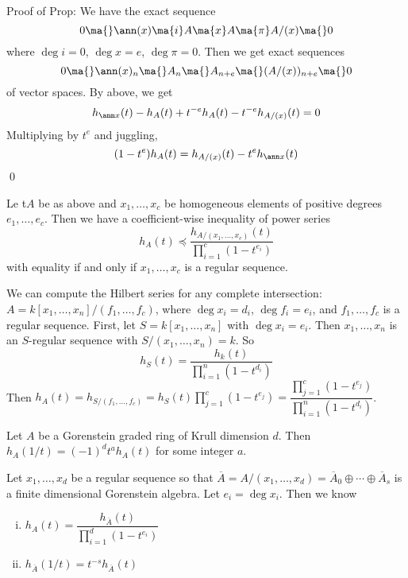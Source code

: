 Proof of Prop: We have the exact sequence
	\[
	0 \ma{} \ann(x) \ma{i} A \ma{x} A \ma{\pi} A/(x) \ma{} 0
	\]
where $\deg i=0$, $\deg x= e$, $\deg \pi = 0$. Then we get exact sequences
	\[
	0 \ma{} \ann(x)_n \ma{} A_n \ma{} A_{n+e} \ma{} (A/(x))_{n+e} \ma{} 0
	\]
of vector spaces. By above, we get
	\[
	h_{\ann x}(t) - h_A(t) + t^{-e} h_A(t) - t^{-e} h_{A/(x)}(t) = 0
	\]
Multiplying by $t^e$ and juggling, 
	\[
	(1-t^e) h_A(t) = h_{A/(x)}(t) - t^e h_{\ann x}(t)
	\]
\qed \\




\begin{cor}
Le t$A$ be as above and $x_1,\ldots,x_c$ be homogeneous elements of positive degrees $e_1,\ldots,e_c$. Then we have a coefficient-wise inequality of power series 
	\[
	h_A(t) \preccurlyeq \dfrac{h_{A/(x_1,\ldots,x_e)}(t)}{\prod_{i=1}^c (1-t^{e_i})}
	\]
with equality if and only if $x_1,\ldots,x_c$ is a regular sequence. 
\end{cor}


\begin{ex}
We can compute the Hilbert series for any complete intersection: $A= k[x_1,\ldots,x_n]/(f_1,\ldots,f_c)$, where $\deg x_i = d_i$, $\deg f_i= e_i$, and $f_1,\ldots,f_c$ is a regular sequence. First, let $S= k[x_1,\ldots,x_n]$ with $\deg x_i= e_i$. Then $x_1,\ldots,x_n$ is an $S$-regular sequence with $S/(x_1,\ldots,x_n)= k$. So 
	\[
	h_S(t) = \dfrac{h_k(t)}{\prod_{i=1}^n (1-t^{d_i})}
	\]
Then $h_A(t) = h_{S/(f_1,\ldots,f_c)}= h_S(t) \prod_{j=1}^c (1-t^{e_j})= \dfrac{\prod_{j=1}^c (1-t^{e_j})}{\prod_{i=1}^n (1-t^{d_i})}$. 
\end{ex}


\begin{prop}
Let $A$ be a Gorenstein graded ring of Krull dimension $d$. Then $h_A(1/t)= (-1)^d t^a h_A(t)$ for some integer $a$. 
\end{prop}

\pf Let $x_1,\ldots, x_d$ be a regular sequence so that $\overline{A}= A/(x_1,\ldots,x_d)= \overline{A}_0 \oplus \cdots \oplus \overline{A}_s$ is a finite dimensional Gorenstein algebra. Let $e_i = \deg x_i$. Then we know 

\begin{enumerate}[(i)]
\item $h_A(t) = \dfrac{h_{\overline{A}}(t)}{\prod_{i=1}^d (1-t^{e_i})}$
\item $h_{\overline{A}}(1/t) = t^{-s} h_{\overline{A}}(t)$
\end{enumerate}

